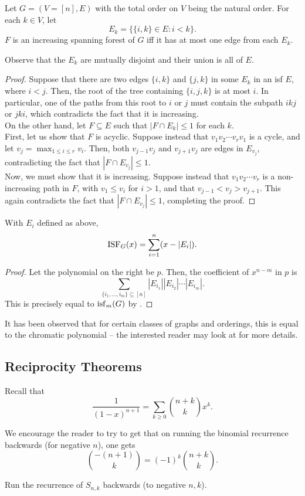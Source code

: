 	\begin{flem}
		\label{lemma: isf}
		Let $G = (V=[n],E)$ with the total order on $V$ being the natural order. For each $k \in V$, let
		\[ E_k = \{ \{i,k\} \in E : i<k \}. \]
		$F$ is an increasing spanning forest of $G$ iff it has at most one edge from each $E_k$. 
	\end{flem}
	Observe that the $E_k$ are mutually disjoint and their union is all of $E$.
	\begin{proof}
		Suppose that there are two edges $\{i,k\}$ and $\{j,k\}$ in some $E_k$ in an isf $E$, where $i<j$. Then, the root of the tree containing $\{i,j,k\}$ is at most $i$. In particular, one of the paths from this root to $i$ or $j$ must contain the subpath $ikj$ or $jki$, which contradicts the fact that it is increasing.\\
		
		On the other hand, let $F \subseteq E$ such that $|F \cap E_k| \le 1$ for each $k$.\\
		First, let us show that $F$ is acyclic. Suppose instead that $v_1v_2\cdots v_rv_1$ is a cycle, and let $v_j = \max_{1 \le i \le r} v_i$. Then, both $v_{j-1}v_j$ and $v_{j+1}v_j$ are edges in $E_{v_j}$, contradicting the fact that $|F \cap E_{v_j}| \le 1$.\\
		Now, we must show that it is increasing. Suppose instead that $v_1v_2\cdots v_r$ is a non-increasing path in $F$, with $v_1 \le v_i$ for $i > 1$, and that $v_{j-1} < v_j > v_{j+1}$. This again contradicts the fact that $|F \cap E_{v_j}| \le 1$, completing the proof.
	\end{proof}

	\begin{ftheo}
		\label{theo: isf}
		With $E_i$ defined as above,
		\[ \operatorname{ISF}_G(x) = \sum_{i=1}^n (x-|E_i|). \]
	\end{ftheo}
	\begin{proof}
		Let the polynomial on the right be $p$. Then, the coefficient of $x^{n-m}$ in $p$ is
		\[ \sum_{\{i_1,\ldots,i_m\} \subseteq [n]} |E_{i_1}| |E_{i_2}| \cdots |E_{i_m}|. \]
		This is precisely equal to $\operatorname{isf}_m(G)$ by .
	\end{proof}

	It has been observed that for certain classes of graphs and orderings, this is equal to the chromatic polynomial -- the interested reader may look at \cite{sagan} for more details.

\subsection{Reciprocity Theorems}
\label{reciprocity theorems}

	Recall that
	\[ \frac{1}{(1-x)^{n+1}} = \sum_{k \ge 0} \binom{n+k}{k} x^k. \]
	
	We encourage the reader to try \Cref{****} to get that on running the binomial recurrence backwards (for negative $n$), one gets
	\[ \binom{-(n+1)}{k} = (-1)^k \binom{n+k}{k}. \]

	\begin{exercise}
		Run the recurrence of $S_{n,k}$ backwards (to negative $n,k$).
	\end{exercise}
